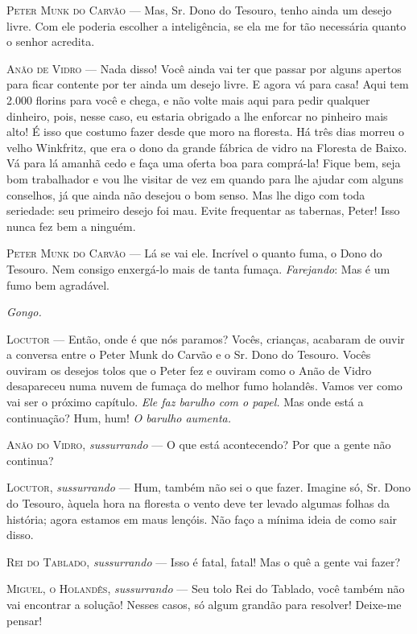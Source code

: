 \textsc{Peter Munk do Carvão} --- Mas, Sr. Dono do Tesouro, tenho ainda um desejo
livre. Com ele poderia escolher a inteligência, se ela me for tão
necessária quanto o senhor acredita.

\textsc{Anão de Vidro} --- Nada disso! Você ainda vai ter que passar por alguns
apertos para ficar contente por ter ainda um desejo livre. E agora vá
para casa! Aqui tem 2.000 florins para você e chega, e não volte mais
aqui para pedir qualquer dinheiro, pois, nesse caso, eu estaria obrigado
a lhe enforcar no pinheiro mais alto! É isso que costumo fazer desde que
moro na floresta. Há três dias morreu o velho Winkfritz, que era o dono
da grande fábrica de vidro na Floresta de Baixo. Vá para lá amanhã cedo
e faça uma oferta boa para comprá-la! Fique bem, seja bom trabalhador e
vou lhe visitar de vez em quando para lhe ajudar com alguns conselhos,
já que ainda não desejou o bom senso. Mas lhe digo com toda seriedade:
seu primeiro desejo foi mau. Evite frequentar as tabernas, Peter! Isso
nunca fez bem a ninguém.

\textsc{Peter Munk do Carvão} --- Lá se vai ele. Incrível o quanto fuma, o Dono do
Tesouro. Nem consigo enxergá-lo mais de tanta fumaça. \emph{Farejando}:
Mas é um fumo bem agradável.

\emph{Gongo.}

\textsc{Locutor} --- Então, onde é que nós paramos? Vocês, crianças, acabaram de
ouvir a conversa entre o Peter Munk do Carvão e o Sr. Dono do Tesouro.
Vocês ouviram os desejos tolos que o Peter fez e ouviram como o Anão de
Vidro desapareceu numa nuvem de fumaça do melhor fumo holandês. Vamos
ver como vai ser o próximo capítulo. \emph{Ele faz barulho com o papel.}
Mas onde está a continuação? Hum, hum! \emph{O barulho aumenta.}

\textsc{Anão do Vidro}, \emph{sussurrando} --- O que está acontecendo? Por que a
gente não continua?

\textsc{Locutor}, \emph{sussurrando} --- Hum, também não sei o que fazer. Imagine
só, Sr. Dono do Tesouro, àquela hora na floresta o vento deve ter levado
algumas folhas da história; agora estamos em maus lençóis. Não faço a
mínima ideia de como sair disso.

\textsc{Rei do Tablado}, \emph{sussurrando} --- Isso é fatal, fatal! Mas o quê a
gente vai fazer?

\textsc{Miguel, o Holandês}, \emph{sussurrando} --- Seu tolo Rei do Tablado, você
também não vai encontrar a solução! Nesses casos, só algum grandão para
resolver! Deixe-me pensar!

